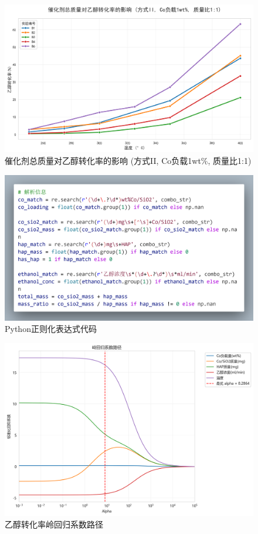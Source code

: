 \begin{figure}[h]%
	\centering%
	\includegraphics [scale=0.6]{图/2-6-1-2.png}
	\caption{催化剂总质量对乙醇转化率的影响 (方式II, Co负载1wt\%, 质量比1:1)} 
	\label{fig:1}
\end{figure}

\begin{figure}[h]%
	\centering%
	\includegraphics [scale=0.2]{图/code_1.png}
	\caption{Python正则化表达式代码} 
	\label{fig:1}
\end{figure}

\begin{figure}[h]%
	\centering%
	\includegraphics [scale=0.6]{图/ling-yichun.png}
	\caption{乙醇转化率岭回归系数路径} 
	\label{fig:1}
\end{figure}

